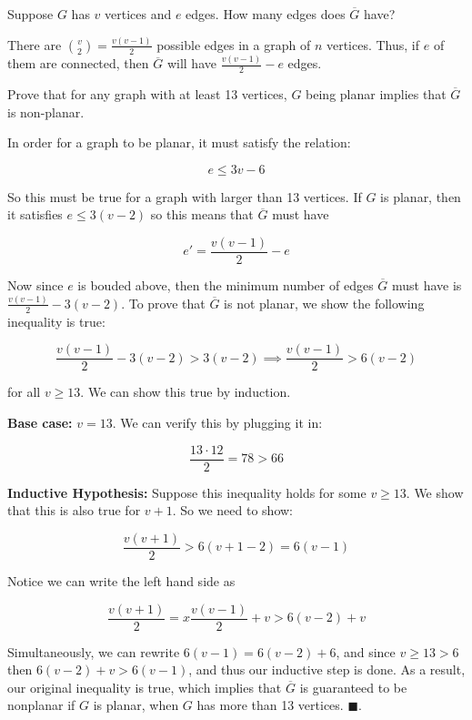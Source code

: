 \documentclass[11pt]{article}
\begin{document}
\begin{Parts}

\Part Suppose $G$ has $v$ vertices and $e$ edges.  How many edges does $\overline{G}$ have?


\begin{solution}
    There are ${v \choose 2} = \frac{v(v-1)}{2}$ possible edges in a graph of $n$ vertices. Thus, if $e$ of them are connected, then $\overline G$ will have $\frac{v(v-1)}{2} - e$ edges.
\end{solution}
\Part Prove that for any graph with at least 13 vertices, $G$ being planar implies that $\overline{G}$ is non-planar.

\begin{solution}
    In order for a graph to be planar, it must satisfy the relation:

    \[ e \leq 3v - 6\]

    So this must be true for a graph with larger than 13 vertices. If $G$ is planar, then it satisfies $e \leq 3(v - 2)$ so this means that $\overline G$ must have 

    \[ e' = \frac{v(v-1)}{2} - e\] 

    Now since $e$ is bouded above, then the minimum number of edges $\overline G$ must have is $\frac{v(v-1)}{2} - 3(v-2)$. To prove that $\overline G$ is not planar, we show the following inequality is true:

    \[ \frac{v(v-1)}{2} - 3(v-2) > 3(v-2) \implies \frac{v(v-1)}{2} > 6(v-2)\]

    for all $v \geq 13$. We can show this true by induction. 

    \textbf{Base case:} $v = 13$. We can verify this by plugging it in:

    \[\frac{13 \cdot 12}{2} = 78 > 66\]

    \textbf{Inductive Hypothesis:} Suppose this inequality holds for some $v \geq 13$. We show that this is also true for $v+1$. So we need to show:

    \[ \frac{v(v+1)}{2} > 6(v+1-2) = 6(v-1) \]

    Notice we can write the left hand side as 

    \[\frac{v(v+1)}{2} =x \frac{v(v-1)}{2} + v > 6(v - 2) + v\] 

    Simultaneously, we can rewrite $6(v-1) = 6(v-2) + 6$, and since $v \geq 13 > 6$ then $6(v-2) + v > 6(v-1)$, and thus our inductive step is done. As a result, our original inequality is true, which implies that $\overline G$ is guaranteed to be nonplanar if $G$ is planar, when $G$ has more than 13 vertices. $\blacksquare$.





\end{solution}
\end{Parts}
\end{document}
